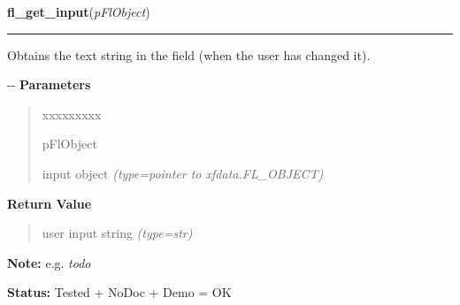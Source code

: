 \hspace{.8\funcindent}\begin{boxedminipage}{\funcwidth}

    \raggedright \textbf{fl\_get\_input}(\textit{pFlObject})

    \vspace{-1.5ex}

    \rule{\textwidth}{0.5\fboxrule}
\setlength{\parskip}{2ex}

Obtains the text string in the field (when the user has changed it).

-{}-
\setlength{\parskip}{1ex}
      \textbf{Parameters}
      \vspace{-1ex}

      \begin{quote}
        \begin{Ventry}{xxxxxxxxx}

          \item[pFlObject]


input object
            {\it (type=pointer to xfdata.FL\_OBJECT)}

        \end{Ventry}

      \end{quote}

      \textbf{Return Value}
    \vspace{-1ex}

      \begin{quote}

user input string
      {\it (type=str)}

      \end{quote}

\textbf{Note:} 
e.g. \emph{todo}


\textbf{Status:} 
Tested + NoDoc + Demo = OK


    \end{boxedminipage}

    \label{xformslib:flinput:fl_set_input_filter}

    \vspace{0.5ex}

